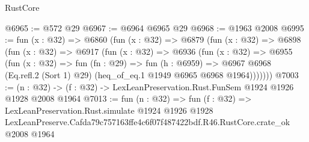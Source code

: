 \begin{lexlean}{RustCore}
\begin{coremodule}
@6965 := @572 @29
@6967 := @6964 @6965 @29
@6968 := @1963 @2008
@6995 := fun (x : @32) =>
  @6860
    (fun (x : @32) =>
    @6879
      (fun (x : @32) =>
      @6898
        (fun (x : @32) =>
        @6917
          (fun (x : @32) =>
          @6936
            (fun (x : @32) =>
            @6955
              (fun (x : @32) =>
              fun (fn : @29) =>
              fun (h : @6959) =>
              @6967 @6968 (Eq.refl.{2} (Sort 1) @29) (heq_of_eq.{1} @1949 @6965 @6968 @1964)))))))
@7003 := (n : @32) -> (f : @32) -> LexLeanPreservation.Rust.FunSem @1924 @1926 @1928 @2008 @1964
@7013 := fun (n : @32) =>
  fun (f : @32) =>
  LexLeanPreservation.Rust.simulate
    @1924
    @1926
    @1928
    LexLeanPreserve.Cafda79c757163ffe4c6f07f487422bdf.R46.RustCore.crate_ok
    @2008
    @1964
\end{coremodule}
\end{lexlean}
